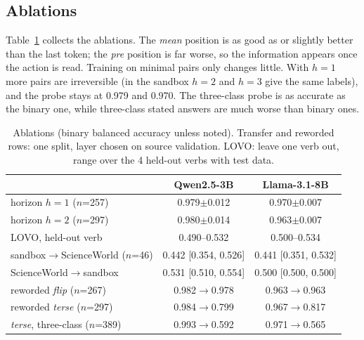 \documentclass[conference]{IEEEtran}
\begin{document}
\subsection{Ablations}
Table~\ref{tab:abl} collects the ablations. The \emph{mean} position is as good as or slightly better than the last token; the \emph{pre} position is far worse, so the information appears once the action is read. Training on minimal pairs only changes little. With $h=1$ more pairs are irreversible (in the sandbox $h=2$ and $h=3$ give the same labels), and the probe stays at 0.979 and 0.970. The three-class probe is as accurate as the binary one, while three-class stated answers are much worse than binary ones.

\begin{table}[t]
\centering
\caption{Ablations (binary balanced accuracy unless noted). Transfer and reworded rows: one split, layer chosen on source validation. LOVO: leave one verb out, range over the 4 held-out verbs with test data.}
\label{tab:abl}
\setlength{\tabcolsep}{3pt}
\begin{tabular}{lcc}
\toprule
 & Qwen2.5-3B & Llama-3.1-8B \\
\midrule
horizon $h=1$ ($n$=257) & 0.979$\pm$0.012 & 0.970$\pm$0.007 \\
horizon $h=2$ ($n$=297) & 0.980$\pm$0.014 & 0.963$\pm$0.007 \\
LOVO, held-out verb & 0.490--0.532 & 0.500--0.534 \\
sandbox$\to$ScienceWorld ($n$=46) & 0.442 [0.354, 0.526] & 0.441 [0.351, 0.532] \\
ScienceWorld$\to$sandbox & 0.531 [0.510, 0.554] & 0.500 [0.500, 0.500] \\
reworded \emph{flip} ($n$=267) & 0.982$\to$0.978 & 0.963$\to$0.963 \\
reworded \emph{terse} ($n$=297) & 0.984$\to$0.799 & 0.967$\to$0.817 \\
\emph{terse}, three-class ($n$=389) & 0.993$\to$0.592 & 0.971$\to$0.565 \\
\bottomrule
\end{tabular}
\end{table}
\end{document}
